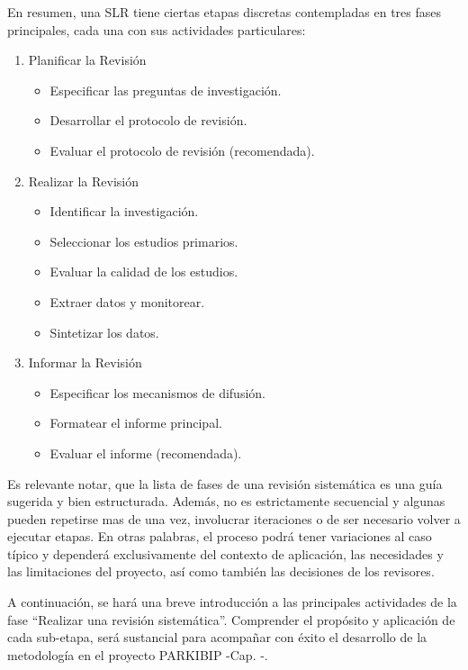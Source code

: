 En resumen, una SLR tiene ciertas etapas discretas contempladas en tres fases principales, cada una con sus actividades particulares:
\begin{enumerate}
    \item Planificar la Revisión 
    \begin{itemize}
        \item Especificar las preguntas de investigación.
        \item Desarrollar el protocolo de revisión.
        \item Evaluar el protocolo de revisión (recomendada).
    \end{itemize}
    \item Realizar la Revisión
    \begin{itemize}
        \item Identificar la investigación.
        \item Seleccionar los estudios primarios.
        \item Evaluar la calidad de los estudios.
        \item Extraer datos y monitorear.
        \item Sintetizar los datos.
    \end{itemize}
    \item Informar la Revisión
    \begin{itemize}
        \item Especificar los mecanismos de difusión.
        \item Formatear el informe principal.
        \item Evaluar el informe (recomendada).
    \end{itemize}
\end{enumerate}

Es relevante notar, que la lista de fases de una revisión sistemática es una guía sugerida y bien estructurada. Además, no es estrictamente secuencial y algunas pueden repetirse mas de una vez, involucrar iteraciones o de ser necesario volver a ejecutar etapas. En otras palabras, el proceso podrá tener variaciones al caso típico y dependerá exclusivamente del contexto de aplicación, las necesidades y las limitaciones del proyecto, así como también las decisiones de los revisores.

A continuación, se hará una breve introducción a las principales actividades de la fase ``Realizar una revisión sistemática''. Comprender el propósito y aplicación de cada sub-etapa, será sustancial para acompañar con éxito el desarrollo de la metodología en el proyecto PARKIBIP -Cap. -. 


